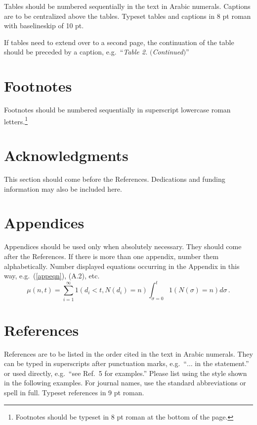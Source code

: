 \documentclass{ws-ijitdm}
\begin{document}
Tables should be numbered sequentially in the text in Arabic
numerals. Captions are to be centralized above the tables.
Typeset tables and captions in 8 pt roman with baselineskip of 10 pt.

If tables need to extend over to a second page, the continuation
of the table should be preceded by a caption, 
e.g.~``{\it Table 2.} $(${\it Continued}$)$''

\section{Footnotes}

Footnotes should be numbered sequentially in superscript
lowercase roman letters.\footnote{Footnotes should be
typeset in 8 pt roman at the bottom of the page.}

\section*{Acknowledgments}

This section should come before the References. Dedications and funding 
information may also be included here.

\appendix

\section{Appendices}

Appendices should be used only when absolutely necessary. They
should come after the References. If there is more than one
appendix, number them alphabetically. Number displayed equations
occurring in the Appendix in this way, e.g.~(\ref{appeqn}), (A.2),
etc.
\begin{equation}
\mu(n, t) = {\sum^\infty_{i=1} 1(d_i < t, N(d_i) = n)}{
\int^t_{\sigma=0} 1(N(\sigma) = n)d\sigma}\,.
\label{appeqn}
\end{equation}

\section*{References}

References are to be listed in the order cited in the text in Arabic
numerals.  They can be typed in superscripts after punctuation marks,
e.g.~``$\ldots$ in the statement.\cite{1}'' or used directly,
e.g.~``see Ref.~5 for examples.'' Please list using the style shown in
the following examples.  For journal names, use the standard
abbreviations or spell in full. Typeset references in 9 pt roman.
\end{document}
